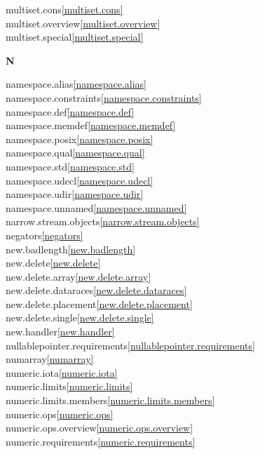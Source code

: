 \begin{multicols}{2}
multiset.cons\quad\ref{multiset.cons}\\
multiset.overview\quad\ref{multiset.overview}\\
multiset.special\quad\ref{multiset.special}\\
\par \textbf{N}\par
namespace.alias\quad\ref{namespace.alias}\\
namespace.constraints\quad\ref{namespace.constraints}\\
namespace.def\quad\ref{namespace.def}\\
namespace.memdef\quad\ref{namespace.memdef}\\
namespace.posix\quad\ref{namespace.posix}\\
namespace.qual\quad\ref{namespace.qual}\\
namespace.std\quad\ref{namespace.std}\\
namespace.udecl\quad\ref{namespace.udecl}\\
namespace.udir\quad\ref{namespace.udir}\\
namespace.unnamed\quad\ref{namespace.unnamed}\\
narrow.stream.objects\quad\ref{narrow.stream.objects}\\
negators\quad\ref{negators}\\
new.badlength\quad\ref{new.badlength}\\
new.delete\quad\ref{new.delete}\\
new.delete.array\quad\ref{new.delete.array}\\
new.delete.dataraces\quad\ref{new.delete.dataraces}\\
new.delete.placement\quad\ref{new.delete.placement}\\
new.delete.single\quad\ref{new.delete.single}\\
new.handler\quad\ref{new.handler}\\
nullablepointer.requirements\quad\ref{nullablepointer.requirements}\\
numarray\quad\ref{numarray}\\
numeric.iota\quad\ref{numeric.iota}\\
numeric.limits\quad\ref{numeric.limits}\\
numeric.limits.members\quad\ref{numeric.limits.members}\\
numeric.ops\quad\ref{numeric.ops}\\
numeric.ops.overview\quad\ref{numeric.ops.overview}\\
numeric.requirements\quad\ref{numeric.requirements}\\

\end{multicols}
